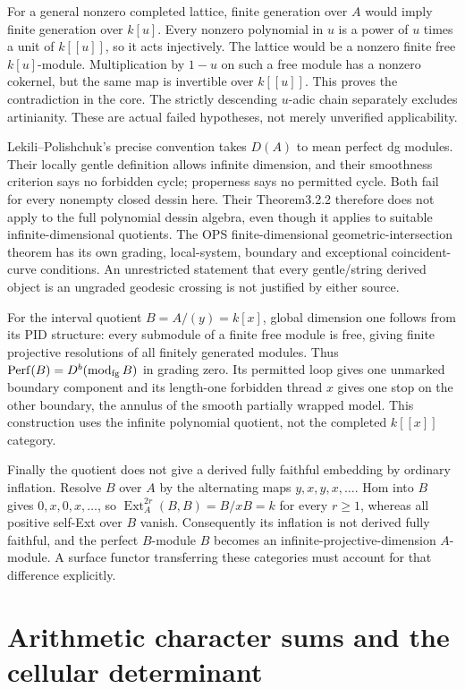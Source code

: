 \documentclass[11pt]{article}
\theoremstyle{definition}\newtheorem{definition}[theorem]{Definition}
\theoremstyle{remark}\newtheorem{remark}[theorem]{Remark}
\begin{document}
For a general nonzero completed lattice, finite generation over $A$ would imply finite generation over $k[u]$. Every nonzero polynomial in $u$ is a power of $u$ times a unit of $k[[u]]$, so it acts injectively. The lattice would be a nonzero finite free $k[u]$-module. Multiplication by $1-u$ on such a free module has a nonzero cokernel, but the same map is invertible over $k[[u]]$. This proves the contradiction in the core. The strictly descending $u$-adic chain separately excludes artinianity. These are actual failed hypotheses, not merely unverified applicability.

Lekili--Polishchuk's precise convention takes $D(A)$ to mean perfect dg modules. Their locally gentle definition allows infinite dimension, and their smoothness criterion says no forbidden cycle; properness says no permitted cycle. Both fail for every nonempty closed dessin here. Their Theorem3.2.2 therefore does not apply to the full polynomial dessin algebra, even though it applies to suitable infinite-dimensional quotients. The OPS finite-dimensional geometric-intersection theorem has its own grading, local-system, boundary and exceptional coincident-curve conditions. An unrestricted statement that every gentle/string derived object is an ungraded geodesic crossing is not justified by either source.

For the interval quotient $B=A/(y)=k[x]$, global dimension one follows from its PID structure: every submodule of a finite free module is free, giving finite projective resolutions of all finitely generated modules. Thus $\operatorname{Perf}(B)=D^b(\operatorname{mod}_{\rm fg}B)$ in grading zero. Its permitted loop gives one unmarked boundary component and its length-one forbidden thread $x$ gives one stop on the other boundary, the annulus of the smooth partially wrapped model. This construction uses the infinite polynomial quotient, not the completed $k[[x]]$ category.

Finally the quotient does not give a derived fully faithful embedding by ordinary inflation. Resolve $B$ over $A$ by the alternating maps $y,x,y,x,\ldots$. Hom into $B$ gives $0,x,0,x,\ldots$, so $\operatorname{Ext}_A^{2r}(B,B)=B/xB=k$ for every $r\ge1$, whereas all positive self-Ext over $B$ vanish. Consequently its inflation is not derived fully faithful, and the perfect $B$-module $B$ becomes an infinite-projective-dimension $A$-module. A surface functor transferring these categories must account for that difference explicitly.


\section{Arithmetic character sums and the cellular determinant}
\end{document}

